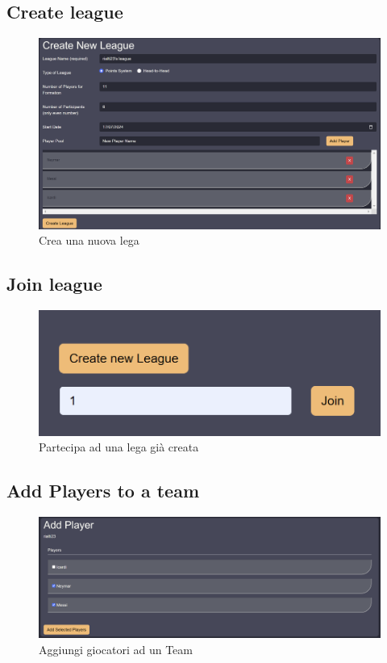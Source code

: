 \documentclass[twoside,openright,titlepage,fleqn,headinclude,12pt,a4paper,BCOR=5mm,footinclude]{scrbook}
\begin{document}
\subsection{Create league}
\begin{figure}[H]
  \centering
  \includegraphics[width=\linewidth]{images/createLeague.png}
  \caption{Crea una nuova lega}
  \label{fig:create}
\end{figure}


\subsection{Join league}
\begin{figure}[H]
  \centering
  \includegraphics[width=\linewidth]{images/joinLeague.png}
  \caption{Partecipa ad una lega già creata}
  \label{fig:join}
\end{figure}

\subsection{Add Players to a team}

\begin{figure}[H]
  \centering
  \includegraphics[width=\linewidth]{images/addPlayer.png}
  \caption{Aggiungi giocatori ad un Team}
  \label{fig:addPlayer}
\end{figure}
\end{document}
